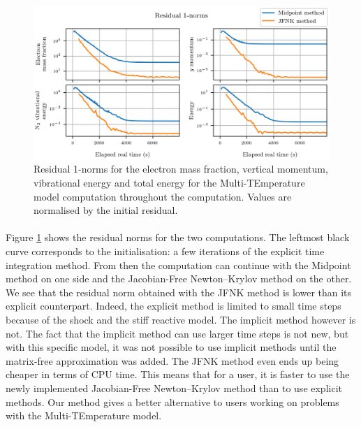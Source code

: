         \begin{figure}
          \centering
          \includegraphics{figures/sphere_mte_residuals.png}
          \caption{Residual 1-norms for the electron mass fraction, vertical momentum,  vibrational energy and total energy for the Multi-TEmperature model computation throughout the computation.
          Values are normalised by the initial residual.}
          \label{fig:sphere_mte_residuals}
        \end{figure}

        \paragraph{}
        Figure \ref{fig:sphere_mte_residuals} shows the residual norms for the two computations.
        The leftmost black curve corresponds to the initialisation: a few iterations of the explicit time integration method.
        From then the computation can continue with the Midpoint method on one side and the Jacobian-Free Newton--Krylov method on the other.
        We see that the residual norm obtained with the JFNK method is lower than its explicit counterpart.
        Indeed, the explicit method is limited to small time steps because of the shock and the stiff reactive model.
        The implicit method however is not.
        The fact that the implicit method can use larger time steps is not new, but with this specific model, it was not possible to use implicit methods until the matrix-free approximation was added.
        The JFNK method even ends up being cheaper in terms of CPU time.
        This means that for a user, it is faster to use the newly implemented Jacobian-Free Newton--Krylov method than to use explicit methods.
        Our method gives a better alternative to users working on problems with the Multi-TEmperature model.


